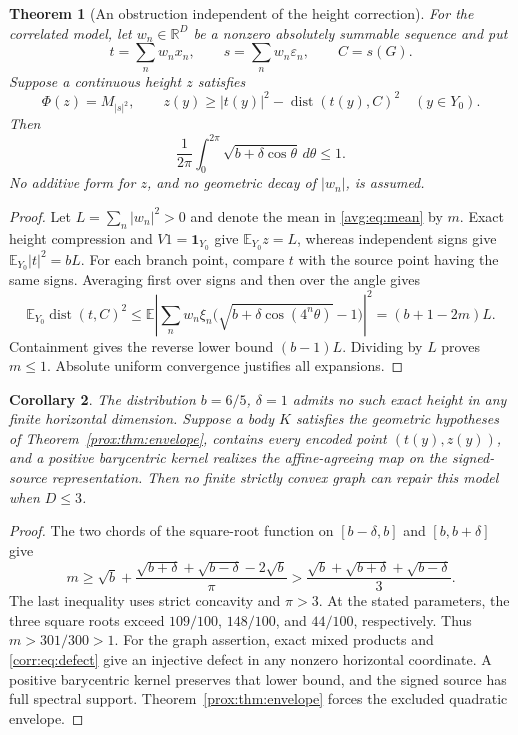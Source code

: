 \documentclass[11pt,letterpaper]{amsart}
\newtheorem{theorem}{Theorem}[section]
\newtheorem{corollary}[theorem]{Corollary}
\theoremstyle{definition}
\theoremstyle{remark}
\numberwithin{equation}{section}
\DeclareMathOperator{\dist}{dist}
\newcommand{\R}{\mathbb R}
\newcommand{\ind}{\mathbf 1}
\begin{document}
\begin{theorem}[An obstruction independent of the height correction]
\label{avg:lem:vacuum}
For the correlated model, let $w_n\in\R^D$ be a nonzero absolutely
summable sequence and put
\[
 t=\sum_nw_nx_n,\qquad s=\sum_nw_n\varepsilon_n,
 \qquad C=s(G).
\]
Suppose a continuous height $z$ satisfies
\[
 \Phi(z)=M_{|s|^2},\qquad
 z(y)\ge|t(y)|^2-\dist(t(y),C)^2\quad(y\in Y_0).
\]
Then
\begin{equation}\label{avg:eq:mean}
                   \frac1{2\pi}\int_0^{2\pi}
                     \sqrt{b+\delta\cos\theta}\,d\theta\le1.
\end{equation}
No additive form for $z$, and no geometric decay of $|w_n|$, is assumed.
\end{theorem}
\begin{proof}
Let $L=\sum_n|w_n|^2>0$ and denote the mean in
\eqref{avg:eq:mean} by $m$. Exact height compression and
$V1=\ind_{Y_0}$ give $\mathbb E_{Y_0}z=L$, whereas independent signs
give $\mathbb E_{Y_0}|t|^2=bL$.
For each branch point, compare $t$ with the source point having the
same signs. Averaging first over signs and then over the angle gives
\[
 \mathbb E_{Y_0}\dist(t,C)^2
 \le\mathbb E\left|\sum_nw_n\xi_n
           \bigl(\sqrt{b+\delta\cos(4^n\theta)}-1\bigr)\right|^2
 =(b+1-2m)L.
\]
Containment gives the reverse lower bound $(b-1)L$. Dividing by $L$
proves $m\le1$. Absolute uniform convergence justifies all expansions.
\end{proof}

\begin{corollary}\label{avg:cor:first}
The distribution $b=6/5$, $\delta=1$ admits no such exact height in
any finite horizontal dimension. Suppose a body $K$ satisfies the
geometric hypotheses of Theorem~\ref{prox:thm:envelope}, contains
every encoded point $(t(y),z(y))$, and a positive barycentric kernel
realizes the affine-agreeing map on the signed-source representation.
Then no finite strictly convex graph can repair this model when
$D\le3$.
\end{corollary}
\begin{proof}
The two chords of the square-root function on $[b-\delta,b]$ and
$[b,b+\delta]$ give
\[
 m\ge\sqrt b+
  \frac{\sqrt{b+\delta}+\sqrt{b-\delta}-2\sqrt b}{\pi}
 >\frac{\sqrt b+\sqrt{b+\delta}+\sqrt{b-\delta}}3.
\]
The last inequality uses strict concavity and $\pi>3$. At the stated
parameters, the three square roots exceed $109/100$, $148/100$, and
$44/100$, respectively. Thus $m>301/300>1$.
For the graph assertion, exact mixed products and
\eqref{corr:eq:defect} give an injective defect in any nonzero
horizontal coordinate. A positive barycentric kernel preserves that
lower bound, and the signed source has full spectral support.
Theorem~\ref{prox:thm:envelope} forces the excluded quadratic envelope.
\end{proof}
\end{document}
